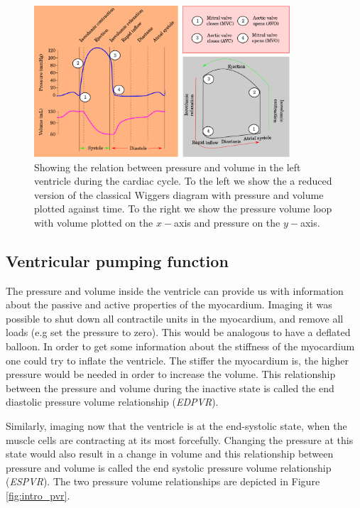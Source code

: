 \begin{figure}[htbp]
  \centering
    \includegraphics[width=0.85\textwidth]{chapters/introduction/figures/cardiac_cycle.png}
\caption{Showing the relation between pressure and volume in the left
  ventricle during the cardiac cycle. To the left we show the a reduced version of
the classical Wiggers diagram with pressure and volume plotted against
time. To the right we show the pressure volume loop
with volume plotted on the $x-$axis and pressure on the $y-$axis. }
\label{fig:pv_loop}
\end{figure}


\subsection{Ventricular pumping function}
\label{sec:ventricular_pumping_function}



The pressure and volume inside the ventricle can provide us with
information about the passive and active properties of the
myocardium. Imaging it was possible to shut down all contractile
units in the myocardium, and remove all loads (e.g set the pressure
to zero). This would be analogous to have a deflated balloon. In order to
get some information about the stiffness of the myocardium one could
try to inflate the ventricle. The stiffer the myocardium is, the
higher pressure would be needed in order to increase the volume.
This relationship between the pressure and volume during the inactive
state is called the end diastolic pressure volume relationship
(\emph{EDPVR}).

Similarly, imaging now that the ventricle is at the end-systolic state,
when the muscle cells are contracting at its most forcefully. Changing
the pressure at this state would also result in a change in volume and
this relationship between pressure and volume  is called the end
systolic pressure volume relationship (\emph{ESPVR}). The two pressure
volume relationships are depicted in Figure \ref{fig:intro_pvr}.

